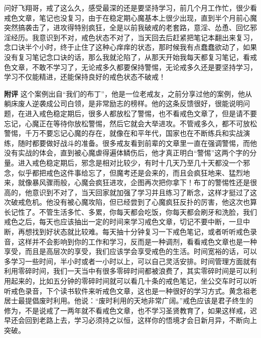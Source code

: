 \begin{case}
    问好飞翔哥，戒了这么久，感受最深的还是要坚持学习，前几个月工作忙，很少看戒色文章，笔记也没复习，由于在稳定期心魔基本上很少出现，直到半个月前心魔突然搞袭击了，进攻得特别疯狂，全是以前我破戒的老套路，意淫、怂恿、回忆邪淫经历。我意识到不对，戒色状态不对了，当天回去后赶紧把笔记本翻出来复习，念口诀半个小时，终于止住了这种心痒痒的状态，那时候我有点蠢蠢欲动了，如果没有复习笔记念口诀的话，那么我就沦陷了，从那天开始我每天都复习笔记，看戒色文章，不敢不学习了，无论戒多久都要保持警惕，无论戒多久还是要坚持学习，学习不仅能精进，还能保持良好的戒色状态不破戒！

    \textbf{附评} 这个案例出自“我们的布丁”，他是一位老戒友，之前分享过他的案例，他从躺床废人逆袭成公司白领，是非常励志的榜样。他的这条反馈很好，很能说明问题，在进入戒色稳定期后，很多人都放松了警惕，也不看戒色文章了，但是请不要忘记，心魔正在等待你放松警惕，然后它就会大举进攻。不管戒多久，都不可放松警惕，千万不要忘记心魔的存在，就像在和平年代，国家也在不断练兵和实战演练，随时都要做好战斗的准备。很多戒友看到前辈的文章里一直在强调警惕，而他没有实战的体会，直到被心魔虐得遍体鳞伤后，他才真正明白“警惕”这两个字的分量。进入戒色稳定期后，邪念是相对比较少，有时十几天乃至几十天都没一个邪念，似乎都把戒色这件事给忘了，但魔考还是会来的，而且会疯狂地来、猛烈地来，就像暴风骤雨般，心魔会疯狂进攻，企图再次把你拿下！布丁的警惕性还是很高的，他意识到不对了，当天回家就加强了学习并且练习了断念，这样才挺过了这次破戒危机。他没有被心魔攻陷，但已经尝到了心魔疯狂反扑的厉害，他这次也算长记性了。不管生活多忙、多累，你每天都会吃饭，你每天都会刷牙和洗脸，我们戒色之后，每天也应该抽出一定的时间来学习戒色文章，切记不要中断，一旦中断，再想找到好状态就比较难。每天抽十分钟复习一下戒色笔记，或者听听戒色录音，这样并不会影响到你的工作和学习，反而是一种调剂，看看戒色文章也是一种享受，而且是高层次的享受，我们应该学会享受戒色的生活。时间宽裕的话，可以多学习一些时间，半小时或者一小时以上，可以自己灵活安排。时间管理方面就有利用零碎时间，我们一天当中有很多零碎时间都被浪费了，其实零碎时间是可以利用起来的，比如五分钟的零碎时间就可以看几十条的戒色笔记，坐公交车时可以听听戒色录音，下个读书软件来听戒色文章，这也是一种很好的学习方式。黄念祖老居士最提倡废时利用。他说：“废时利用的天地非常广阔。”戒色应该是君子终生的修为，不是说戒了一两年就不看戒色文章，也不学习圣贤教育了，如果这样戒，迟早还会回到老路上去，学习必须持之以恒，这样你的悟境才会日新月异，不断向上突破。
\end{case}


